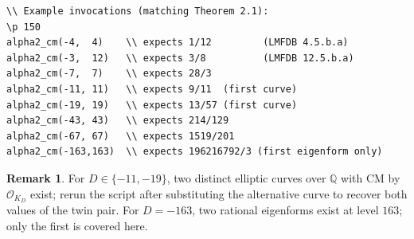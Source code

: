 \documentclass[12pt]{amsart}
\theoremstyle{definition}
\newtheorem{remark}[theorem]{Remark}
\newcommand{\Q}{\mathbb{Q}}
\begin{document}
\begin{verbatim}
\\ Example invocations (matching Theorem 2.1):
\p 150
alpha2_cm(-4,  4)    \\ expects 1/12         (LMFDB 4.5.b.a)
alpha2_cm(-3,  12)   \\ expects 3/8          (LMFDB 12.5.b.a)
alpha2_cm(-7,  7)    \\ expects 28/3
alpha2_cm(-11, 11)   \\ expects 9/11  (first curve)
alpha2_cm(-19, 19)   \\ expects 13/57 (first curve)
alpha2_cm(-43, 43)   \\ expects 214/129
alpha2_cm(-67, 67)   \\ expects 1519/201
alpha2_cm(-163,163)  \\ expects 196216792/3 (first eigenform only)
\end{verbatim}

\begin{remark}
For $D \in \{-11, -19\}$, two distinct elliptic curves over $\Q$ with
CM by $\mathcal{O}_{K_D}$ exist; rerun the script after substituting the
alternative curve to recover both values of the twin pair. For
$D = -163$, two rational eigenforms exist at level $163$; only the
first is covered here.
\end{remark}
\end{document}
